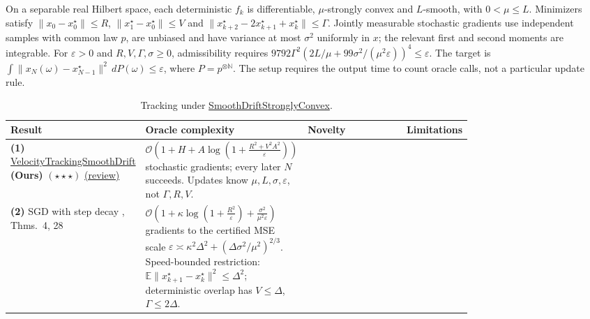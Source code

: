 \begin{table}[tp]
\centering
\caption{Tracking under \href{https://github.com/k3nfalt/longtails/blob/main/LongTails/Setups/SmoothDriftStronglyConvex.lean}{SmoothDriftStronglyConvex}.}\label{tab:SmoothDriftStronglyConvex}
\parbox{\linewidth}{\footnotesize On a separable real Hilbert space, each deterministic $f_k$ is differentiable, $\mu$-strongly convex and $L$-smooth, with $0<\mu\le L$. Minimizers satisfy $\|x_0-x_0^\star\|\le R$, $\|x_1^\star-x_0^\star\|\le V$ and $\|x_{k+2}^\star-2x_{k+1}^\star+x_k^\star\|\le\Gamma$. Jointly measurable stochastic gradients use independent samples with common law $p$, are unbiased and have variance at most $\sigma^2$ uniformly in $x$; the relevant first and second moments are integrable. For $\varepsilon>0$ and $R,V,\Gamma,\sigma\ge0$, admissibility requires $9792\Gamma^2(2L/\mu+99\sigma^2/(\mu^2\varepsilon))^4\le\varepsilon$. The target is $\int\|x_N(\omega)-x_{N-1}^\star\|^2\,dP(\omega)\le\varepsilon$, where $P=p^{\otimes\mathbb N}$. The setup requires the output time to count oracle calls, not a particular update rule.}\par\smallskip
\begin{threeparttable}
\footnotesize
\setlength{\tabcolsep}{4pt}\renewcommand{\arraystretch}{1.25}
\begin{tabularx}{\linewidth}{@{}>{\raggedright\arraybackslash}p{0.20\linewidth}>{\raggedright\arraybackslash}p{0.32\linewidth}>{\raggedright\arraybackslash}p{0.25\linewidth}>{\raggedright\arraybackslash}X@{}}
\toprule
\textbf{Result} & \textbf{Oracle complexity} & \textbf{Novelty} & \textbf{Limitations} \\
\midrule
\textbf{(1)} \href{https://github.com/k3nfalt/longtails/blob/main/LongTails/Theorems/VelocityTrackingSmoothDrift.lean}{Velocity\allowbreak Tracking\allowbreak Smooth\allowbreak Drift} \textbf{(Ours)} $(\star\star\star)$ \href{https://github.com/k3nfalt/longtails/blob/main/scripts/reviews/VelocityTrackingSmoothDrift.md}{(review)}
& $\mathcal{O}\!\left(1+H+A\log\!\left(1+\frac{R^2+V^2A^2}{\varepsilon}\right)\right)$ stochastic gradients; every later $N$ succeeds. Updates know $\mu,L,\sigma,\varepsilon$, not $\Gamma,R,V$.
& & \\
\midrule[1.2pt]
\textbf{(2)} SGD with step decay \citep{sdscCutler2023}, Thms.~4, 28
& $\mathcal{O}\!\left(1+\kappa\log\!\left(1+\frac{R^2}{\varepsilon}\right)+\frac{\sigma^2}{\mu^2\varepsilon}\right)$ gradients to the certified MSE scale $\varepsilon\asymp\kappa^2\Delta^2+(\Delta\sigma^2/\mu^2)^{2/3}$. Speed-bounded restriction: $\mathbb E\|x_{k+1}^\star-x_k^\star\|^2\le\Delta^2$; deterministic overlap has $V\le\Delta$, $\Gamma\le2\Delta$.

\end{tabularx}
\end{threeparttable}
\end{table}
